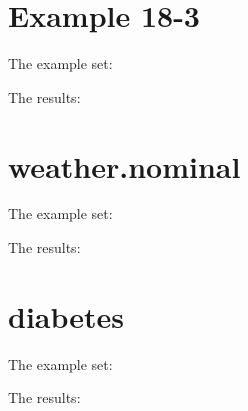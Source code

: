 \documentclass[a4paper]{article}
\begin{document}
\appendix
\section{Example 18-3}
\label{18-3}
The example set:

The results:

\section{weather.nominal}
\label{weather}
The example set:

The results:


\section{diabetes}
\label{diabetes}
The example set:

The results:

\end{document}
